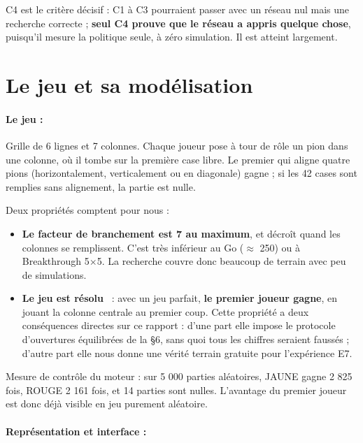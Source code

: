 \documentclass[11pt,a4paper]{article}
\begin{document}
C4 est le critère décisif : C1 à C3 pourraient passer avec un réseau nul mais une
recherche correcte ; \textbf{seul C4 prouve que le réseau a appris quelque chose},
puisqu'il mesure la politique seule, à zéro simulation. Il est atteint largement.

\section{Le jeu et sa modélisation}\label{le-jeu-et-sa-moduxe9lisation}

\paragraph{Le jeu :}

Grille de 6 lignes et 7 colonnes. Chaque joueur pose à tour de rôle un pion dans
une colonne, où il tombe sur la première case libre. Le premier qui aligne quatre
pions (horizontalement, verticalement ou en diagonale) gagne ; si les 42 cases
sont remplies sans alignement, la partie est nulle.

Deux propriétés comptent pour nous :

\begin{itemize}
\setlength{\itemsep}{1pt}\setlength{\parskip}{0pt}
\item
  \textbf{Le facteur de branchement est 7 au maximum}, et décroît quand les colonnes
  se remplissent. C'est très inférieur au Go ($\approx$ 250) ou à Breakthrough 5$\times$5. La
  recherche couvre donc beaucoup de terrain avec peu de simulations.
\item
  \textbf{Le jeu est résolu}~\cite{allis1988,allen1989} : avec un jeu parfait, \textbf{le
  premier joueur gagne}, en jouant la colonne centrale au premier coup. Cette
  propriété a deux conséquences directes sur ce rapport : d'une part elle impose
  le protocole d'ouvertures équilibrées de la §6, sans quoi tous les chiffres
  seraient faussés ; d'autre part elle nous donne une vérité terrain gratuite
  pour l'expérience E7.
\end{itemize}

Mesure de contrôle du moteur : sur 5 000 parties aléatoires, JAUNE gagne 2 825
fois, ROUGE 2 161 fois, et 14 parties sont nulles. L'avantage du premier joueur
est donc déjà visible en jeu purement aléatoire.

\paragraph{Représentation et interface :}
\end{document}
